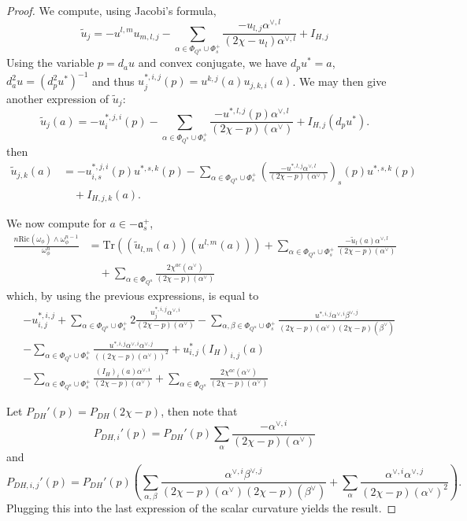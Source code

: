 \documentclass{amsart}
\theoremstyle{definition}
\begin{document}
\begin{proof}
We compute, using Jacobi's formula, 
\[
\tilde{u}_j=-u^{l,m}u_{m,l,j}
-\sum_{\alpha\in\Phi_{Q^u}\cup\Phi_s^+}\frac{-u_{l,j}\alpha^{\vee,l}}{(2\chi-u_l)\alpha^{\vee,l}}
+I_{H,j}
\]
Using the variable $p=d_au$ and convex conjugate, we have 
$d_pu^*=a$, $d^2_au=(d^2_pu^*)^{-1}$ and thus 
$u^{*,i,j}_j(p)=u^{k,j}(a)u_{j,k,i}(a)$.
We may then give another expression of $\tilde{u}_j$:
\[
\tilde{u}_j(a)=-u^{*,j,i}_i(p)
-\sum_{\alpha\in\Phi_{Q^u}\cup\Phi_s^+}\frac{-u^{*,l,j}(p)\alpha^{\vee,l}}{(2\chi-p)(\alpha^{\vee})}
+I_{H,j}(d_pu^*).
\]
then 
\begin{align*}
\tilde{u}_{j,k}(a)& = -u^{*,j,i}_{i,s}(p)u^{*,s,k}(p)
-\sum_{\alpha\in\Phi_{Q^u}\cup\Phi_s^+}
\left(\frac{-u^{*,l,j}\alpha^{\vee,l}}{(2\chi-p)(\alpha^{\vee})}\right)_s(p)u^{*,s,k}(p) \\
& \quad +I_{H,j,k}(a).
\end{align*}
 
We now compute for $a\in -\mathfrak{a}_s^+$,
\begin{align*}
\frac{n\mathrm{Ric}(\omega_{\phi})\wedge \omega_{\phi}^{n-1}}{\omega_{\phi}^n} & =
\mathrm{Tr}((\tilde{u}_{l,m}(a))(u^{l,m}(a))) 
+\sum_{\alpha\in \Phi_{Q^u}\cup\Phi_s^+} \frac{-\tilde{u}_l(a)\alpha^{\vee,l}}{(2\chi-p)(\alpha^{\vee})} \\ 
& \quad +\sum_{\alpha\in \Phi_{Q^u}}\frac{2\chi^{ac}(\alpha^{\vee})}{(2\chi-p)(\alpha^{\vee})} 
\end{align*}
which, by using the previous expressions, 
is equal to 
\begin{align*} 
& -u^{*,i,j}_{i,j} 
+\sum_{\alpha\in \Phi_{Q^u}\cup\Phi_s^+}
2\frac{u^{*,i,j}_j\alpha^{\vee,i}}{(2\chi-p)(\alpha^{\vee})} 
-\sum_{\alpha,\beta\in \Phi_{Q^u}\cup\Phi_s^+} 
\frac{u^{*,i,j}\alpha^{\vee,i}\beta^{\vee,j}}{(2\chi-p)(\alpha^{\vee})(2\chi-p)(\beta^{\vee})} \\
& -\sum_{\alpha\in \Phi_{Q^u}\cup\Phi_s^+}
\frac{u^{*,i,j}\alpha^{\vee,i}\alpha^{\vee,j}}{((2\chi-p)(\alpha^{\vee}))^2}
+u^*_{i,j}(I_H)_{i,j}(a)
 \\
& -\sum_{\alpha\in \Phi_{Q^u}\cup\Phi_s^+} \frac{(I_H)_i(a)\alpha^{\vee,i}}{(2\chi-p)(\alpha^{\vee})}
+\sum_{\alpha\in \Phi_{Q^u}}\frac{2\chi^{ac}(\alpha^{\vee})}{(2\chi-p)(\alpha^{\vee})}
\end{align*}

Let $P_{DH}'(p)=P_{DH}(2\chi-p)$, then note that 
\[
P_{DH,i}'(p)=P_{DH}'(p)\sum_{\alpha}\frac{-\alpha^{\vee,i}}{(2\chi-p)(\alpha^{\vee})}
\]
and 
\[
P_{DH,i,j}'(p)=P_{DH}'(p)\left(\sum_{\alpha,\beta}\frac{\alpha^{\vee,i}\beta^{\vee,j}}{(2\chi-p)(\alpha^{\vee})(2\chi-p)(\beta^{\vee})}+\sum_{\alpha}\frac{\alpha^{\vee,i}\alpha^{\vee,j}}{(2\chi-p)(\alpha^{\vee})^2}\right).
\]
Plugging this into the last expression of the scalar curvature yields the result.
\end{proof}
\end{document}
